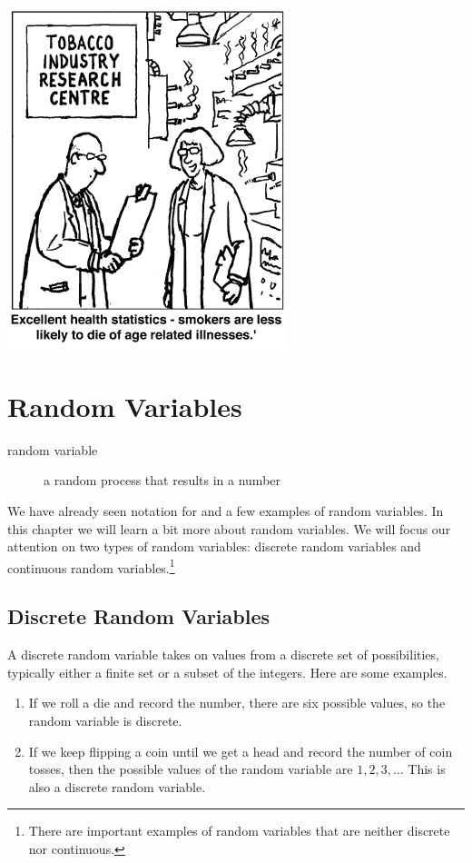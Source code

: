 \documentclass[twoside]{book}\usepackage[]{graphicx}\usepackage[]{xcolor}
\newcounter{example}[section]
\newif\ifsolutions
\newif\ifsolutionslocal
\begin{document}
\shipoutProblems

\vfill

\begin{center}
	\includegraphics[width = .4\textwidth]{images/cigarettes-cartoon}
\end{center}

\ifsolutions
\ifsolutionslocal
\newpage
\section*{Solutions}
\shipoutSolutions
\fi
\fi




\chapter{Random Variables}

\begin{description}
\item[random variable]a random process that results in a number
\end{description}

We have already seen notation for and a few examples of random variables.
In this chapter we will learn a bit more about random variables.  We will
focus our attention on two types of random variables: discrete random variables
and continuous random variables.\footnote{There are important examples 
of random variables that are neither discrete nor continuous.}

\section{Discrete Random Variables}

A discrete random variable takes on values from a discrete set of possibilities,
typically either a finite set or a subset of the integers.  Here are some examples.
\begin{enumerate}
\item If we roll a die and record the number, there are six possible values,
so the random variable is discrete.
\item
If we keep flipping a coin until we get a head and record the number of coin
tosses, then the possible values of the random variable are $1, 2, 3, \dots$
This is also a discrete random variable.
\end{enumerate}
\end{document}

